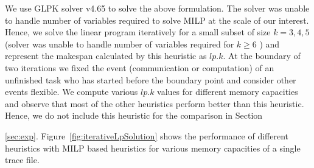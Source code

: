 \documentclass[sigconf]{acmart}
\begin{document}
	
	We use GLPK solver v4.65 to solve the above formulation. The solver was unable to handle number of variables required to solve MILP at the scale of our interest. Hence, we solve the linear program iteratively for a small subset of size $k=3,4,5$ (solver was unable to handle number of variables required for $k\ge6$ ) and represent the makespan calculated by this heuristic as $lp.k$. At the boundary of two iterations we fixed the event (communication or computation) of an unfinished task who has started before the boundary point and consider other events flexible. We compute various $lp.k$ values for different memory capacities and observe that most of the other heuristics perform better than this heuristic. Hence, we do not include this heuristic for the comparison in Section~{\ref{sec:exp}. Figure~\ref{fig:iterativeLpSolution} shows the performance of different heuristics with MILP based heuristics for various memory capacities of a single trace file.
		\begin{figure}[htb]

\end{figure}}
\end{document}

